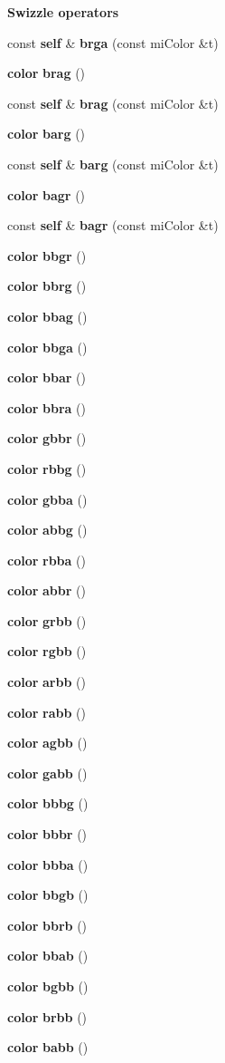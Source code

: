 \begin{Indent}{\bf Swizzle operators}
\begin{CompactItemize}
\item 
const {\bf self} \& {\bf brga} (const mi\-Color \&t)
\item 
{\bf color} {\bf brag} ()
\item 
const {\bf self} \& {\bf brag} (const mi\-Color \&t)
\item 
{\bf color} {\bf barg} ()
\item 
const {\bf self} \& {\bf barg} (const mi\-Color \&t)
\item 
{\bf color} {\bf bagr} ()
\item 
const {\bf self} \& {\bf bagr} (const mi\-Color \&t)
\item 
{\bf color} {\bf bbgr} ()
\item 
{\bf color} {\bf bbrg} ()
\item 
{\bf color} {\bf bbag} ()
\item 
{\bf color} {\bf bbga} ()
\item 
{\bf color} {\bf bbar} ()
\item 
{\bf color} {\bf bbra} ()
\item 
{\bf color} {\bf gbbr} ()
\item 
{\bf color} {\bf rbbg} ()
\item 
{\bf color} {\bf gbba} ()
\item 
{\bf color} {\bf abbg} ()
\item 
{\bf color} {\bf rbba} ()
\item 
{\bf color} {\bf abbr} ()
\item 
{\bf color} {\bf grbb} ()
\item 
{\bf color} {\bf rgbb} ()
\item 
{\bf color} {\bf arbb} ()
\item 
{\bf color} {\bf rabb} ()
\item 
{\bf color} {\bf agbb} ()
\item 
{\bf color} {\bf gabb} ()
\item 
{\bf color} {\bf bbbg} ()
\item 
{\bf color} {\bf bbbr} ()
\item 
{\bf color} {\bf bbba} ()
\item 
{\bf color} {\bf bbgb} ()
\item 
{\bf color} {\bf bbrb} ()
\item 
{\bf color} {\bf bbab} ()
\item 
{\bf color} {\bf bgbb} ()
\item 
{\bf color} {\bf brbb} ()
\item 
{\bf color} {\bf babb} ()
\item 

\end{CompactItemize}
\end{Indent}

